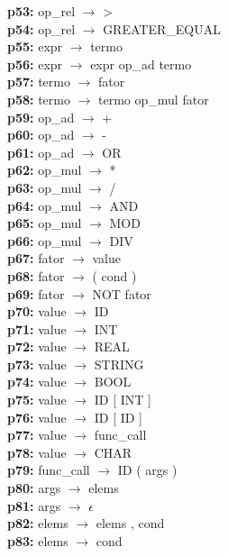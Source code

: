 \documentclass[12pt,a4paper]{report}
\begin{document}
\begin{tabbing}
\textbf{p53:} \> op\_rel \(\to\) > \\
\textbf{p54:} \> op\_rel \(\to\) GREATER\_EQUAL \\
\textbf{p55:} \> expr \(\to\) termo \\
\textbf{p56:} \> expr \(\to\) expr op\_ad termo \\
\textbf{p57:} \> termo \(\to\) fator \\
\textbf{p58:} \> termo \(\to\) termo op\_mul fator \\
\textbf{p59:} \> op\_ad \(\to\) + \\
\textbf{p60:} \> op\_ad \(\to\) - \\
\textbf{p61:} \> op\_ad \(\to\) OR \\
\textbf{p62:} \> op\_mul \(\to\) * \\
\textbf{p63:} \> op\_mul \(\to\) / \\
\textbf{p64:} \> op\_mul \(\to\) AND \\
\textbf{p65:} \> op\_mul \(\to\) MOD \\
\textbf{p66:} \> op\_mul \(\to\) DIV \\
\textbf{p67:} \> fator \(\to\) value \\
\textbf{p68:} \> fator \(\to\) ( cond ) \\
\textbf{p69:} \> fator \(\to\) NOT fator \\
\textbf{p70:} \> value \(\to\) ID \\
\textbf{p71:} \> value \(\to\) INT \\
\textbf{p72:} \> value \(\to\) REAL \\
\textbf{p73:} \> value \(\to\) STRING \\
\textbf{p74:} \> value \(\to\) BOOL \\
\textbf{p75:} \> value \(\to\) ID [ INT ] \\
\textbf{p76:} \> value \(\to\) ID [ ID ] \\
\textbf{p77:} \> value \(\to\) func\_call \\
\textbf{p78:} \> value \(\to\) CHAR \\
\textbf{p79:} \> func\_call \(\to\) ID ( args ) \\
\textbf{p80:} \> args \(\to\) elems \\
\textbf{p81:} \> args \(\to\) \(\epsilon\) \\
\textbf{p82:} \> elems \(\to\) elems , cond \\
\textbf{p83:} \> elems \(\to\) cond \\
\end{tabbing}
\end{document}
